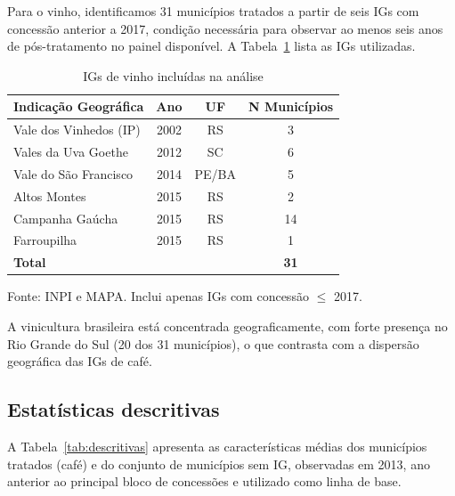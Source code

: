 \documentclass[12pt, a4paper]{article}
\begin{document}
Para o vinho, identificamos 31 municípios tratados a partir de seis IGs com concessão anterior a 2017, condição necessária para observar ao menos seis anos de pós-tratamento no painel disponível. A Tabela~\ref{tab:igs_vinho} lista as IGs utilizadas.

\begin{table}[htbp]
\centering
\caption{IGs de vinho incluídas na análise}
\label{tab:igs_vinho}
\begin{threeparttable}
\begin{tabular}{lccc}
\toprule
Indicação Geográfica & Ano & UF & N Municípios \\
\midrule
Vale dos Vinhedos (IP) & 2002 & RS    & 3 \\
Vales da Uva Goethe    & 2012 & SC    & 6 \\
Vale do São Francisco  & 2014 & PE/BA & 5 \\
Altos Montes           & 2015 & RS    & 2 \\
Campanha Gaúcha        & 2015 & RS    & 14 \\
Farroupilha            & 2015 & RS    & 1 \\
\midrule
\textbf{Total} & & & \textbf{31} \\
\bottomrule
\end{tabular}
\begin{tablenotes}
\small
\item Fonte: INPI e MAPA. Inclui apenas IGs com concessão $\leq$ 2017.
\end{tablenotes}
\end{threeparttable}
\end{table}

A vinicultura brasileira está concentrada geograficamente, com forte presença no Rio Grande do Sul (20 dos 31 municípios), o que contrasta com a dispersão geográfica das IGs de café.

\subsection{Estatísticas descritivas}

A Tabela~\ref{tab:descritivas} apresenta as características médias dos municípios tratados (café) e do conjunto de municípios sem IG, observadas em 2013, ano anterior ao principal bloco de concessões e utilizado como linha de base.
\end{document}
